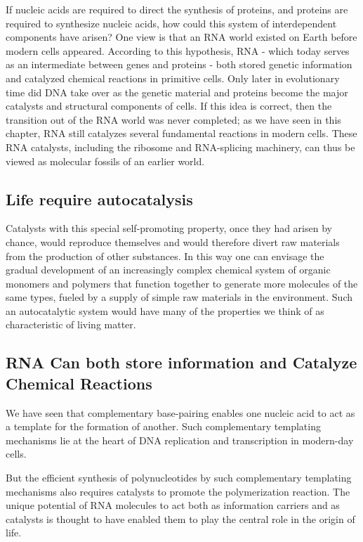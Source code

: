 If nucleic acids are required
to direct the synthesis of proteins, and proteins are required to synthesize
nucleic acids, how could this system of interdependent components have
arisen? One view is that an RNA world existed on Earth before modern
cells appeared. According to this hypothesis, RNA - which
today serves as an intermediate between genes and proteins - both stored
genetic information and catalyzed chemical reactions in primitive cells.
Only later in evolutionary time did DNA take over as the genetic material
and proteins become the major catalysts and structural components of
cells. If this idea is correct, then the transition out of the RNA world was
never completed; as we have seen in this chapter, RNA still catalyzes
several fundamental reactions in modern cells. These RNA catalysts,
including the ribosome and RNA-splicing machinery, can thus be viewed
as molecular fossils of an earlier world.

\subsection{Life require autocatalysis}

Catalysts with this special self-promoting property, once they had arisen
by chance, would reproduce themselves and would therefore divert raw
materials from the production of other substances. In this way one can
envisage the gradual development of an increasingly complex chemical
system of organic monomers and polymers that function together to generate
more molecules of the same types, fueled by a supply of simple
raw materials in the environment. Such an autocatalytic system would
have many of the properties we think of as characteristic of living matter.

\subsection{RNA Can both store information and Catalyze Chemical Reactions}

We have seen that complementary base-pairing enables one nucleic acid
to act as a template for the formation of another. Such
complementary templating mechanisms lie at the heart of DNA replication
and transcription in modern-day cells.

But the efficient synthesis of polynucleotides by such complementary
templating mechanisms also requires catalysts to promote the polymerization
reaction. The unique potential of RNA molecules to
act both as information carriers and as catalysts is thought to have enabled
them to play the central role in the origin of life.

